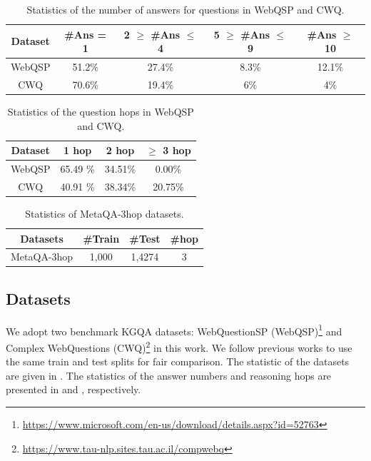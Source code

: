 

\begin{table}[]
    \centering
    \caption{Statistics of the number of answers for questions in WebQSP and CWQ.}
    \label{tab:ans_dist}
    \begin{tabular}{@{}ccccc@{}}
        \toprule
        Dataset & \#Ans = 1 & 2 $\geq$ \#Ans $\leq$ 4 & 5 $\geq$ \#Ans $\leq$ 9 & \#Ans $\geq$ 10 \\ \midrule
        WebQSP  & 51.2\%    & 27.4\%                  & 8.3\%                   & 12.1\%          \\
        CWQ     & 70.6\%    & 19.4\%                  & 6\%                     & 4\%             \\ \bottomrule
    \end{tabular}%

\end{table}

\begin{table}[]
    \centering
    \caption{Statistics of the question hops in WebQSP and CWQ.}
    \label{tab:hop_dist}
    \begin{tabular}{@{}cccc@{}}
        \toprule
        Dataset & 1 hop                         & 2 hop   & $\geq$ 3 hop \\ \midrule
        WebQSP  & 65.49                      \% & 34.51\% & 0.00\%       \\
        CWQ     & 40.91                      \% & 38.34\% & 20.75\%      \\ \bottomrule
    \end{tabular}%
\end{table}

\begin{table}[]
    \centering
    \caption{Statistics of MetaQA-3hop datasets.}
    \label{tab:metaqa}
    \begin{tabular}{@{}c|ccc@{}}
        \toprule
        Datasets    & \#Train & \#Test & \#hop \\ \midrule
        MetaQA-3hop & 1,000   & 1,4274 & 3     \\\bottomrule
    \end{tabular}%
\end{table}

\subsection{Datasets}\label{app:dataset}
We adopt two benchmark KGQA datasets: WebQuestionSP (WebQSP)\footnote{\url{https://www.microsoft.com/en-us/download/details.aspx?id=52763}} \citep{yih2016value} and Complex WebQuestions (CWQ)\footnote{\url{https://www.tau-nlp.sites.tau.ac.il/compwebq}} \citep{talmor2018web} in this work. We follow previous works \citep{sun2018open,jiang2022unikgqa} to use the same train and test splits for fair comparison. The statistic of the datasets are given in . The statistics of the answer numbers and reasoning hops are presented in  and , respectively.

